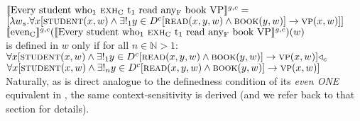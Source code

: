 \ex{}
$\intension[g,c]{Every student who\textsubscript{1} {\scshape exh}\textsubscript{C} t\textsubscript{1} read any\textsubscript{F} book VP}=$\\\emptyfill$[\lambda{w_s}.\forall{x}[\predicate{student}(x,w)\land\exists!_1{y\in{D^c}}[\predicate{read}(x,y,w)\land\predicate{book}(y,w)]\rightarrow\predicate{vp}(x,w)]]$
\xe
\ex{}
$\intension[g,c]{even\textsubscript{C}}(\intension[g,c]{Every student who\textsubscript{1} {\scshape exh}\textsubscript{C} t\textsubscript{1} read any\textsubscript{F} book VP})(w)$\\is defined in $w$ only if for all $n\in\mathbb{N}>1$:\\$\forall{x}[\predicate{student}(x,w)\land\exists!_1{y\in{D^c}}[\predicate{read}(x,y,w)\land\predicate{book}(y,w)]\rightarrow\predicate{vp}(x,w)]\lprob_c$\\\emptyfill$\forall{x}[\predicate{student}(x,w)\land\exists!_n{y\in{D^c}}[\predicate{read}(x,y,w)\land\predicate{book}(y,w)]\rightarrow\predicate{vp}(x,w)]$
\xe
Naturally, as  is direct analogue to the definedness condition of its \textit{even \MakeUppercase{one}} equivalent in , the same context-sensitivity is derived (and we refer back to that section for details).





